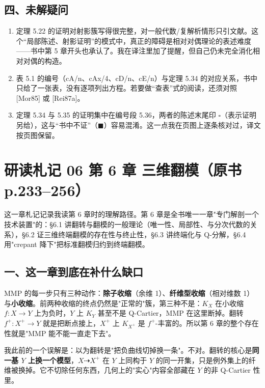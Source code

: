 \subsection*{四、未解疑问}

\begin{enumerate}
\item 定理 5.22 的证明对射影簇写得很完整，对一般代数/复解析情形只引文献。这个“局部陈述、射影证明”的模式中，真正的障碍是相对对偶理论的表述难度——书中第 5 章开头也承认了。我在译注里加了提醒，但自己仍未完全消化相对对偶的构造。
\item 表 5.1 的编号（cA/n、cAx/4、cD/n、cE/n）与定理 5.34 的对应关系，书中只给了一张表，没有逐项列出方程。若要做“查表”式的阅读，还须对照 [Mor85] 或 [Rei87a]。
\item 定理 5.34 与 5.35 的证明集中在编号段 5.36，两者的陈述末尾印 $\square$（表示证明另给），这与“书中不证”（$\blacksquare$）容易混淆。这一点我在页图上逐条核对过，译文按页图保留。
\end{enumerate}

\section*{研读札记 06 \textperiodcentered{} 第 6 章 三维翻模（原书 p.233--256）}

这一章札记记录我读第 6 章时的理解路径。第 6 章是全书唯一一章"专门解剖一个技术装置"的：\S6.1 讲翻转与翻模的一般理论（唯一性、局部性、与分次代数的关系），\S6.2 证三维终端翻模的存在性与终止性，\S6.3 讲终端化与 Q-分解，\S6.4 用"crepant 降下"把标准翻模归约到终端翻模。

\subsection*{一、这一章到底在补什么缺口}

MMP 的每一步只有三种动作：\textbf{除子收缩}（余维 1）、\textbf{纤维型收缩}（相对维数 1）与\textbf{小收缩}。前两种收缩的终点仍然是"正常的"簇，第三种不是：$K_X$ 在小收缩 $f:X\to Y$ 上为负时，$Y$ 上 $K_Y$ 甚至不是 Q-Cartier，MMP 在这里断掉。翻转 $f^+:X^+\to Y$ 就是把断点接上，$X^+$ 上 $K_{X^+}$ 是 $f^+$-丰富的。所以第 6 章的整个存在性就是"MMP 能不能一直走下去"。

我此前的一个误解是：以为翻转是"把负曲线切掉换一条"。不对。翻转的核心是\textbf{同一基 $Y$ 上换一个模型}，$X\dashrightarrow X^+$ 在 $Y$ 上同构于 $Y$ 的同一开集，只是例外集上的纤维被换掉。它不切除任何东西，几何上的"实心"内容全部藏在 $Y$ 的非 Q-Cartier 性里。

